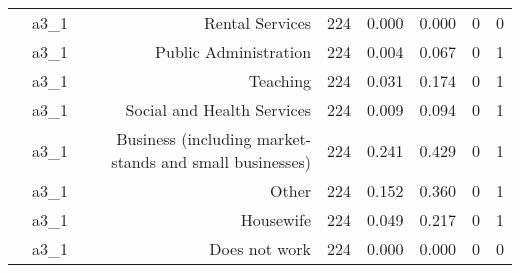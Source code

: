 \begin{table}[htbp]
\begin{tabular}{rrrrrrrr}
          & a3\_1 & Rental Services & 224   & 0.000 & 0.000 & 0     & 0 \\
          & a3\_1 & Public Administration & 224   & 0.004 & 0.067 & 0     & 1 \\
          & a3\_1 & Teaching & 224   & 0.031 & 0.174 & 0     & 1 \\
          & a3\_1 & Social and Health Services & 224   & 0.009 & 0.094 & 0     & 1 \\
          & a3\_1 & Business (including market-stands and small  businesses) & 224   & 0.241 & 0.429 & 0     & 1 \\
          & a3\_1 & Other & 224   & 0.152 & 0.360 & 0     & 1 \\
          & a3\_1 & Housewife & 224   & 0.049 & 0.217 & 0     & 1 \\
          & a3\_1 & Does not work & 224   & 0.000 & 0.000 & 0     & 0 \\
    \bottomrule
    \end{tabular}%
  \label{tab:addlabel}%
\end{table}%
